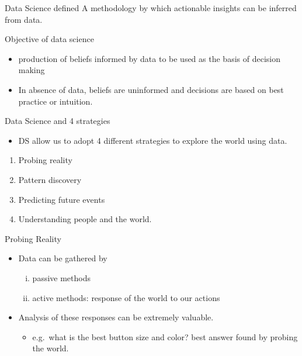 \begin{frame}{Data Science defined}
\protect\hypertarget{data-science-defined}{}
A methodology by which actionable insights can be inferred from data.
\end{frame}

\begin{frame}{Objective of data science}
\protect\hypertarget{objective-of-data-science}{}
\begin{itemize}
\tightlist
\item
  production of beliefs informed by data to be used as the basis of
  decision making
\item
  In absence of data, beliefs are uninformed and decisions are based on
  best practice or intuition.
\end{itemize}
\end{frame}

\begin{frame}{Data Science and 4 strategies}
\protect\hypertarget{data-science-and-4-strategies}{}
\begin{itemize}
\tightlist
\item
  DS allow us to adopt 4 different strategies to explore the world using
  data.
\end{itemize}

\begin{enumerate}
\tightlist
\item
  Probing reality
\item
  Pattern discovery
\item
  Predicting future events
\item
  Understanding people and the world.
\end{enumerate}
\end{frame}

\begin{frame}{Probing Reality}
\protect\hypertarget{probing-reality}{}
\begin{itemize}
\tightlist
\item
  Data can be gathered by

  \begin{enumerate}
  [i)]
  \tightlist
  \item
    passive methods
  \item
    active methods: response of the world to our actions
  \end{enumerate}
\item
  Analysis of these responses can be extremely valuable.

  \begin{itemize}
  \tightlist
  \item
    e.g.~what is the best button size and color? best answer found by
    probing the world.
  \end{itemize}
\end{itemize}
\end{frame}

